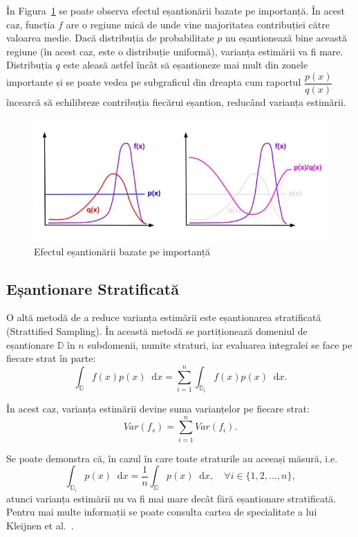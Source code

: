 \documentclass[12pt,a4paper]{report}
\newcommand*\diff{\mathop{}\!\mathrm{d}}
\numberwithin{equation}{section} %
\begin{document}
În Figura~\ref{fig:is} se poate observa efectul eșantionării bazate pe importanță.
În acest caz, funcția $f$ are o regiune mică de unde vine majoritatea contribuției
către valoarea medie. Dacă distribuția de probabilitate $p$ nu eșantionează bine
această regiune (în acest caz, este o distribuție uniformă), varianța estimării
va fi mare. Distribuția $q$ este aleasă astfel încât să eșantioneze mai mult din
zonele importante și se poate vedea pe subgraficul din dreapta cum raportul
$\dfrac{p(x)}{q(x)}$ încearcă să echilibreze contribuția fiecărui eșantion, reducând
varianța estimării.

\begin{figure}[th]
	\centering
	\includegraphics[width=\textwidth]{pics/is.png}
	\caption{Efectul eșantionării bazate pe importanță\protect\footnotemark}
	\label{fig:is}
\end{figure}

\subsection{Eșantionare Stratificată}

O altă metodă de a reduce varianța estimării este eșantionarea stratificată (Strattified Sampling).
În această metodă se partiționează domeniul de eșantionare $\mathbb{D}$ în $n$ subdomenii,
numite straturi, iar evaluarea integralei se face pe fiecare strat în parte:
\begin{equation}
	\int_{\mathbb{D}} f(x) p(x)\diff x = \sum_{i=1}^{n} \int_{\mathbb{D}_i} f(x) p(x)\diff x.
\end{equation}

În acest caz, varianța estimării devine suma varianțelor pe fiecare strat:
\begin{equation}
	Var(f_s) = \sum_{i=1}^{n} Var(f_i).
\end{equation}

Se poate demonstra că, în cazul în care toate straturile au aceeași măsură, i.e.
\begin{equation}
	\int_{\mathbb{D}_i} p(x)\diff x = \frac{1}{n}\int_{\mathbb{D}} p(x)\diff x, \quad \forall i \in \{1, 2, \ldots, n\},
\end{equation}
atunci varianța estimării nu va fi mai mare decât fără eșantionare stratificată.
Pentru mai multe informații se poate consulta cartea de specialitate a lui Kleijnen et al.~\cite{Kleijnen2013}.
\end{document}
